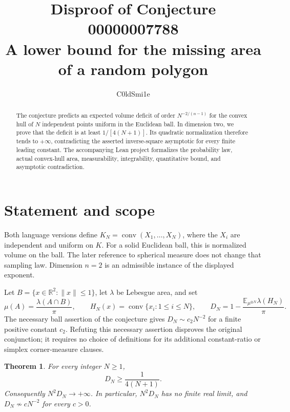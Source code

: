 \documentclass[11pt]{article}
\title{Disproof of Conjecture 00000007788\\[3pt]\large A lower bound for the missing area of a random polygon}
\author{C0ldSmi1e}
\date{}
\newtheorem{theorem}{Theorem}
\newcommand{\E}{\mathbb E}
\newcommand{\R}{\mathbb R}
\begin{document}
\maketitle
\begin{abstract}
The conjecture predicts an expected volume deficit of order
$N^{-2/(n-1)}$ for the convex hull of $N$ independent points uniform in
the Euclidean ball. In dimension two, we prove that the deficit is at
least $1/[4(N+1)]$. Its quadratic normalization therefore tends to
$+\infty$, contradicting the asserted inverse-square asymptotic for
every finite leading constant. The accompanying Lean project formalizes
the probability law, actual convex-hull area, measurability,
integrability, quantitative bound, and asymptotic contradiction.
\end{abstract}

\section{Statement and scope}
Both language versions define $K_N=\operatorname{conv}(X_1,\ldots,X_N)$,
where the $X_i$ are independent and uniform on $K$. For a solid
Euclidean ball, this is normalized volume on the ball. The later
reference to spherical measure does not change that sampling law.
Dimension $n=2$ is an admissible instance of the displayed exponent.

Let $B=\{x\in\R^2:\lVert x\rVert\leq1\}$, let $\lambda$ be Lebesgue
area, and set
\[
 \mu(A)=\frac{\lambda(A\cap B)}{\pi},\qquad
 H_N(x)=\operatorname{conv}\{x_i:1\leq i\leq N\},\qquad
 D_N=1-\frac{\E_{\mu^{\otimes N}}\lambda(H_N)}{\pi}.
\]
The necessary ball assertion of the conjecture gives
$D_N\sim c_2N^{-2}$ for a finite positive constant $c_2$.
Refuting this necessary assertion disproves the original conjunction;
it requires no choice of definitions for its additional constant-ratio
or simplex corner-measure clauses.

\begin{theorem}\label{thm:main}
For every integer $N\geq1$,
\[
 D_N\geq\frac{1}{4(N+1)}.
\]
Consequently $N^2D_N\to+\infty$. In particular, $N^2D_N$ has no finite
real limit, and $D_N\not\sim cN^{-2}$ for every $c>0$.
\end{theorem}

\newpage
\end{document}
